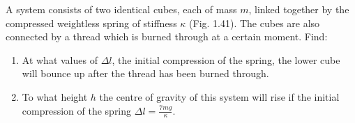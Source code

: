 \item A system consists of two identical cubes, each of mass \( m \), linked together by the compressed weightless spring of stiffness \( \kappa \) (Fig. 1.41). The cubes are also connected by a thread which is burned through at a certain moment. Find:
    \begin{center}
    \end{center}
    \begin{enumerate}
        \item At what values of \( \Delta l \), the initial compression of the spring, the lower cube will bounce up after the thread has been burned through.
        \item To what height \( h \) the centre of gravity of this system will rise if the initial compression of the spring \( \Delta l = \frac{7mg}{\kappa} \).
    \end{enumerate}
